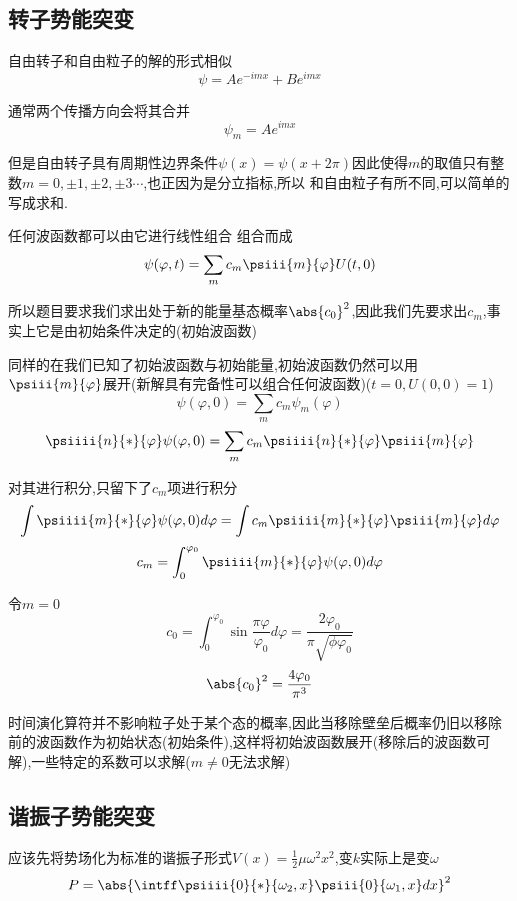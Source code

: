         \subsection{转子势能突变}
            自由转子和自由粒子的解的形式相似
            $$ \psi = A e^{-imx} + Be^{imx} $$
            
            通常两个传播方向会将其合并
            $$ \psi_{m} = A e^{imx} $$ 

            但是自由转子具有周期性边界条件$ \psi(x) = \psi(x+2\pi) $因此使得$m$的取值只有整数$ m = 0,\pm{1},\pm{2},\pm{3}\cdots $,也正因为是分立指标,所以
            和自由粒子有所不同,可以简单的写成求和.
            
            任何波函数都可以由它进行线性组合
            组合而成
            $$ \psi(\varphi,t) = \sum_{m} c_{m} \psiii{m}{\varphi} U(t,0 ) $$

            所以题目要求我们求出处于新的能量基态概率$\abs{c_{0}}^{2}$,因此我们先要求出$c_{m}$,事实上它是由初始条件决定的(初始波函数)

            同样的在我们已知了初始波函数与初始能量,初始波函数仍然可以用$\psiii{m}{\varphi}$展开(新解具有完备性可以组合任何波函数)($t=0,U(0,0)=1$)
            $$ \psi(\varphi,0) = \sum_{m} c_{m} \psi_{m}(\varphi) $$
            $$ \psiiii{n}{*}{\varphi} \psi(\varphi,0) = \sum_{m} c_{m} \psiiii{n}{*}{\varphi} \psiii{m}{\varphi} $$

            对其进行积分,只留下了$c_{m}$项进行积分
            $$ \int \psiiii{m}{*}{\varphi} \psi(\varphi,0) d\varphi = \int c_{m} \psiiii{m}{*}{\varphi} \psiii{m}{\varphi} d\varphi $$
            $$ c_{m} =  \int_{0}^{\varphi_0} \psiiii{m}{*}{\varphi} \psi(\varphi,0) d\varphi$$
            
            令$m=0$
            $$ c_{0} = \int_{0}^{\varphi_0} \sin{\frac{\pi \varphi}{\varphi_{0}}} d\varphi  = \frac{2\varphi_{0}}{\pi \sqrt{\phi \varphi_{0}}} $$
            $$ \abs{c_{0}}^{2} = \frac{4 \varphi_{0}}{\pi^{3}}  $$

            时间演化算符并不影响粒子处于某个态的概率,因此当移除壁垒后概率仍旧以移除前的波函数作为初始状态(初始条件),这样将初始波函数展开(移除后的波函数可解),一些特定的系数可以求解($m\neq0$无法求解)

        \subsection{谐振子势能突变}
            应该先将势场化为标准的谐振子形式$ V(x) = \frac{1}{2} \mu \omega ^{2} x^{2} $,变$k$实际上是变$\omega$
            $$ P = \abs{\intff \psiiii{0}{*}{\omega_{2},x} \psiii{0}{\omega_{1},x} dx }^{2} $$
            
